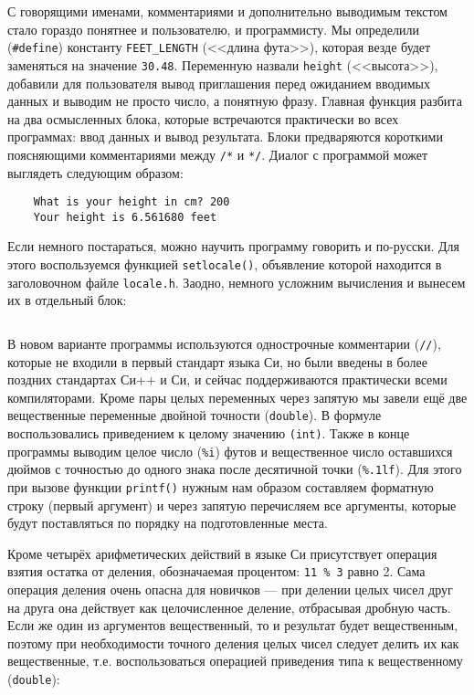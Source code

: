 С говорящими именами, комментариями и дополнительно выводимым текстом стало
гораздо понятнее и пользователю, и программисту. Мы определили
(\texttt{\#define}) константу \texttt{FEET\_LENGTH} (<<длина фута>>), которая везде
будет заменяться на значение \texttt{30.48}. Переменную назвали \texttt{height}
(<<высота>>), добавили для пользователя вывод приглашения перед ожиданием
вводимых данных и выводим не просто число, а понятную фразу. Главная функция
разбита на два осмысленных блока, которые встречаются практически во всех
программах: ввод данных и вывод результата. Блоки предваряются короткими
поясняющими комментариями между \verb|/*| и \verb|*/|. Диалог с программой
может выглядеть следующим образом:
%
\begin{verbatim}
    What is your height in cm? 200
    Your height is 6.561680 feet
\end{verbatim}

Если немного постараться, можно научить программу говорить и по-русски. Для
этого воспользуемся функцией \texttt{setlocale()}, объявление которой
находится в заголовочном файле \texttt{locale.h}. Заодно, немного усложним
вычисления и вынесем их в отдельный блок:
%
\inputminted{c}{samples/feet_rus.c}

В новом варианте программы используются однострочные комментарии (\texttt{//}), которые не
входили в первый стандарт языка Си, но были введены в более поздних стандартах
Си++ и Си, и сейчас поддерживаются практически всеми компиляторами.
Кроме пары целых переменных через запятую мы завели ещё две вещественные
переменные двойной точности (\texttt{double}). В формуле воспользовались
приведением к целому значению \verb|(int)|. Также в конце программы выводим
целое число (\verb|%i|) футов и вещественное число оставшихся дюймов с
точностью до одного знака после десятичной точки (\verb|%.1lf|). Для этого при
вызове функции \texttt{printf()} нужным нам образом составляем форматную
строку (первый аргумент) и через запятую перечисляем все аргументы, которые
будут поставляться по порядку на подготовленные места.

Кроме четырёх арифметических действий в языке Си присутствует операция взятия
остатка от деления, обозначаемая процентом: \texttt{11\ \%\ 3} равно 2.
Сама операция деления очень опасна для новичков --- при делении целых чисел
друг на друга она действует как целочисленное деление, отбрасывая дробную часть.
Если же один из аргументов вещественный, то и результат будет вещественным, поэтому
при необходимости точного деления целых чисел следует делить их как вещественные, т.е. воспользоваться операцией
приведения типа к вещественному (\texttt{double}):
%
\inputminted{c}{samples/equation.c}

